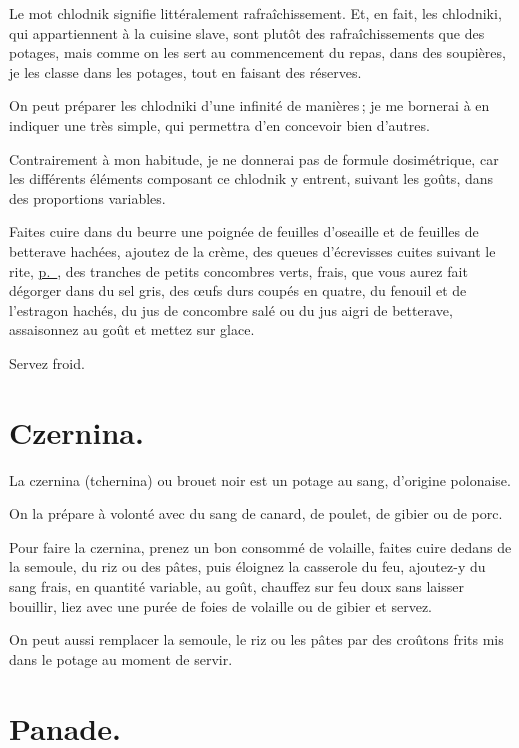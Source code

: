 Le mot chlodnik signifie littéralement rafraîchissement. Et, en fait, les
chlodniki, qui appartiennent à la cuisine slave, sont plutôt des
rafraîchissements que des potages, mais comme on les sert au commencement du
repas, dans des soupières, je les classe dans les potages, tout en faisant des
réserves.

On peut préparer les chlodniki d'une infinité de manières ; je me bornerai à en
indiquer une très simple, qui permettra d'en concevoir bien d'autres.

Contrairement à mon habitude, je ne donnerai pas de formule dosimétrique, car
les différents éléments composant ce chlodnik y entrent, suivant les goûts,
dans des proportions variables.

Faites cuire dans du beurre une poignée de feuilles d'oseaille et de feuilles
de betterave hachées, ajoutez de la crème, des queues d'écrevisses cuites
suivant le rite, \hyperlink{p0287}{p. \pageref{pg0287}}, des tranches de petits
concombres verts, frais, que vous aurez fait dégorger dans du sel gris, des
œufs durs coupés en quatre, du fenouil et de l'estragon hachés, du jus de
concombre salé ou du jus aigri de betterave, assaisonnez au goût et mettez sur
glace.

Servez froid.

\section*{\centering Czernina.}

La czernina (tchernina) ou brouet noir est un potage au sang, d'origine
polonaise.

On la prépare à volonté avec du sang de canard, de poulet, de gibier ou de porc.

Pour faire la czernina, prenez un bon consommé de volaille, faites cuire dedans
de la semoule, du riz ou des pâtes, puis éloignez la casserole du feu,
ajoutez-y du sang frais, en quantité variable, au goût, chauffez sur feu doux
sans laisser bouillir, liez avec une purée de foies de volaille ou de gibier et
servez.

On peut aussi remplacer la semoule, le riz ou les pâtes par des croûtons frits
mis dans le potage au moment de servir.

\section*{\centering Panade.}

